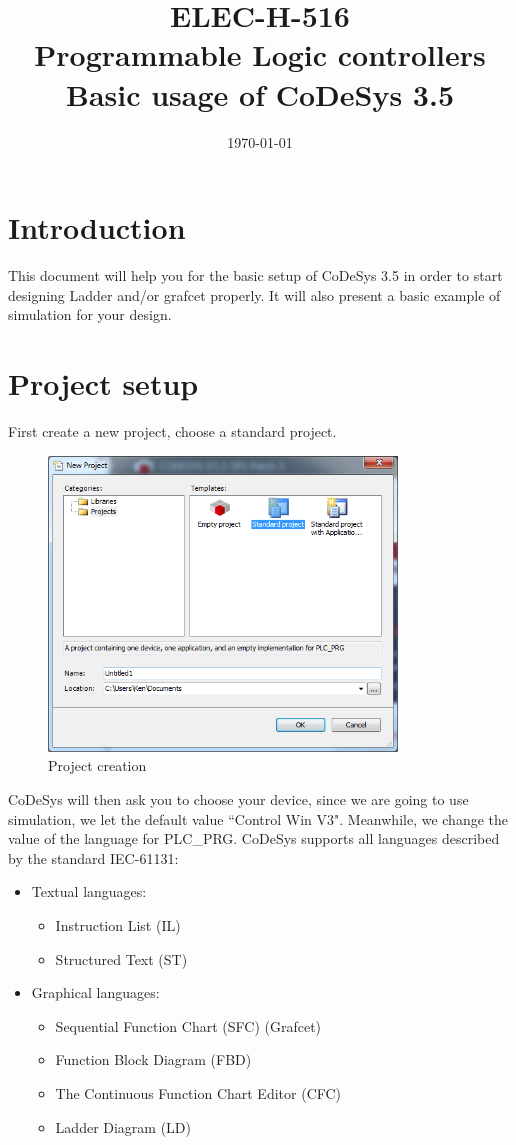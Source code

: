 \documentclass[10pt,a4paper]{article}
\date{\vspace{-1cm}\mydate\today}
\title{\vspace{-2cm} ELEC-H-516 \\ Programmable Logic controllers \\
                                Basic usage of CoDeSys 3.5}
\begin{document}
\maketitle

\section{Introduction}
This document will help you for the basic setup of CoDeSys 3.5 in order to start designing Ladder and/or grafcet properly. It will also present a basic example of simulation for your design.

\section{Project setup}
First create a new project, choose a standard project.

\begin{figure}[h!]
	\begin{center}
		\includegraphics[width=350px]{img2.PNG}
	\end{center}
\caption{Project creation}
\label{fig:creation}
\end{figure}

CoDeSys will then ask you to choose your device, since we are going to use simulation, we let the default value ``Control Win V3".
Meanwhile, we change the value of the language for PLC\_PRG.
CoDeSys supports all languages described by the standard IEC-61131:

\begin{itemize}
\item Textual languages:
\begin{itemize}
\item Instruction List (IL)
\item Structured Text (ST)
\end{itemize}
\item Graphical languages:
\begin{itemize}
\item Sequential Function Chart (SFC) (Grafcet)
\item Function Block Diagram (FBD)
\item The Continuous Function Chart Editor (CFC)
\item Ladder Diagram (LD)
\end{itemize}
\end{itemize}
\end{document}
